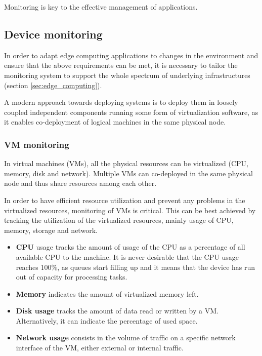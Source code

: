 
Monitoring is key to the effective management of applications. 

\subsection{Device monitoring}

In order to adapt edge computing applications to changes in the environment and ensure that the above requirements can be met, it is necessary to tailor the monitoring system to support the whole spectrum of underlying infrastructures (section \ref{sec:edge_computing}). 

A modern approach towards deploying systems is to deploy them in loosely coupled independent components running some form of virtualization software, as it enables co-deployment of logical machines in the same physical node.

\subsubsection{VM monitoring}

In virtual machines (VMs), all the physical resources can be virtualized (CPU, memory, disk and network). Multiple VMs can co-deployed in the same physical node and thus share resources among each other. 

In order to have efficient resource utilization and prevent any problems in the virtualized resources, monitoring of VMs is critical. This can be best achieved by tracking the utilization of the virtualized resources, mainly usage of CPU, memory, storage and network.

\begin{itemize}

    \item \textbf{CPU} usage tracks the amount of usage of the CPU as a percentage of all available CPU to the machine. It is never desirable that the CPU usage reaches 100\%, as queues start filling up and it means that the device has run out of capacity for processing tasks.
    
    \item \textbf{Memory} indicates the amount of virtualized memory left.
    
    \item \textbf{Disk usage} tracks the amount of data read or written by a VM. Alternatively, it can indicate the percentage of used space.

    \item \textbf{Network usage} consists in the volume of traffic on a specific network interface of the VM, either external or internal traffic.

\end{itemize}

